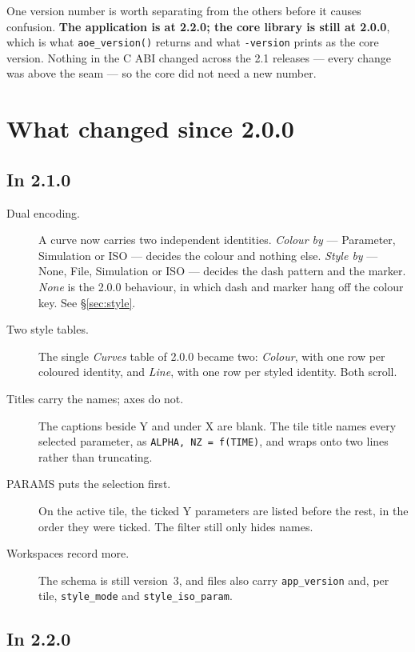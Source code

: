 \documentclass[11pt,a4paper,oneside]{report}
\newcommand{\appver}{2.2.0}
\newcommand{\code}[1]{\texttt{#1}}
\begin{document}
One version number is worth separating from the others before it causes
confusion. \textbf{The application is at \appver; the core library is still at
2.0.0}, which is what \code{aoe\_version()} returns and what
\code{-version} prints as the core version. Nothing in the C ABI changed
across the 2.1 releases --- every change was above the seam --- so the core did
not need a new number.

\chapter{What changed since 2.0.0}
\label{ch:whatsnew}

\section{In 2.1.0}

\begin{description}
\item[Dual encoding.] A curve now carries two independent identities. \emph{Colour by}
  --- Parameter, Simulation or ISO --- decides the colour and nothing else.
  \emph{Style by} --- None, File, Simulation or ISO --- decides the dash pattern
  and the marker. \emph{None} is the 2.0.0 behaviour, in which dash and marker
  hang off the colour key. See \S\ref{sec:style}.
\item[Two style tables.] The single \emph{Curves} table of 2.0.0 became two: \emph{Colour},
  with one row per coloured identity, and \emph{Line}, with one row per styled
  identity. Both scroll.
\item[Titles carry the names; axes do not.] The captions beside Y and under X are
  blank. The tile title names every selected parameter, as
  \code{ALPHA, NZ = f(TIME)}, and wraps onto two lines rather than truncating.
\item[PARAMS puts the selection first.] On the active tile, the ticked Y parameters
  are listed before the rest, in the order they were ticked. The filter still
  only hides names.
\item[Workspaces record more.] The schema is still version~3, and files also carry
  \code{app\_version} and, per tile, \code{style\_mode} and
  \code{style\_iso\_param}.
\end{description}

\section{In \appver}
\end{document}
